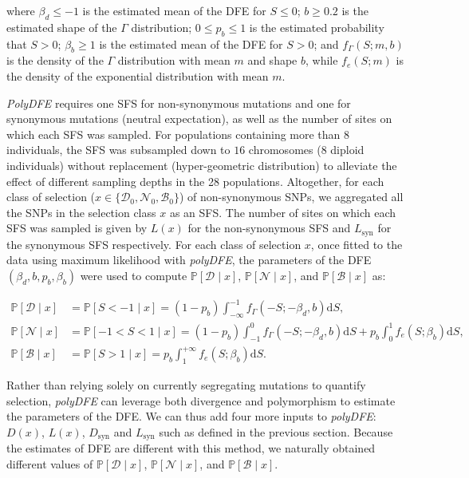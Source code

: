 \documentclass[10pt,letterpaper]{article}
\newcommand{\der}{\text{d}}
\newcommand{\proba}{\mathbb{P}}
\newcommand{\SphyDel}{\mathcal{D}_0}
\newcommand{\SphyNeu}{\mathcal{N}_0}
\newcommand{\SphyBen}{\mathcal{B}_0}
\newcommand{\Sphyclass}{x}
\newcommand{\given}{\mid}
\newcommand{\Spop}{S}
\newcommand{\SpopDel}{\mathcal{D}}
\newcommand{\SpopNeu}{\mathcal{N}}
\newcommand{\SpopBen}{\mathcal{B}}
\newcommand{\AdvMean}{\beta_b}
\newcommand{\DelMean}{\beta_d}
\begin{document}
where $\DelMean \leq -1 $ is the estimated mean of the DFE for $\Spop \leq 0$;
$b \geq 0.2$ is the estimated shape of the $\Gamma$ distribution;
$0 \leq p_b \leq 1$ is the estimated probability that $\Spop > 0$;
$\AdvMean \geq 1$ is the estimated mean of the DFE for $\Spop > 0$;
and $f_{\Gamma}(\Spop; m, b)$ is the density of the $\Gamma$ distribution with mean $m$ and shape $b$, while $f_{e}(\Spop; m)$ is the density of the exponential distribution with mean $m$.

\textit{PolyDFE} requires one SFS for non-synonymous mutations and one for synonymous mutations (neutral expectation), as well as the number of sites on which each SFS was sampled.
For populations containing more than $8$ individuals, the SFS was subsampled down to $16$ chromosomes ($8$ diploid individuals) without replacement (hyper-geometric distribution) to alleviate the effect of different sampling depths in the 28 populations.
Altogether, for each class of selection ($\Sphyclass \in \{\SphyDel, \SphyNeu, \SphyBen \}$) of non-synonymous SNPs, we aggregated all the SNPs in the selection class $\Sphyclass$ as an SFS.
The number of sites on which each SFS was sampled is given by $L(\Sphyclass)$ for the non-synonymous SFS and $L_{\text{syn}}$ for the synonymous SFS respectively.
For each class of selection $\Sphyclass$, once fitted to the data using maximum likelihood with \textit{polyDFE}, the parameters of the DFE $\left( \DelMean , b, p_b, \AdvMean \right)$ were used to compute $\proba [ \SpopDel \given  \Sphyclass] $, $\proba [ \SpopNeu \given \Sphyclass]$, and $\proba [ \SpopBen \given \Sphyclass]$ as:

\begin{align}
\proba [ \SpopDel \given  \Sphyclass] &= \proba [ \Spop < -1 \given \Sphyclass ] = \left( 1 - p_b \right) \int_{-\infty}^{-1} f_{\Gamma}(-\Spop; -\DelMean, b) \der \Spop, \label{eq:polyProbaDel} \\
\proba [ \SpopNeu \given \Sphyclass] &= \proba [ -1 < \Spop < 1 \given \Sphyclass ] = \left( 1 - p_b \right) \int_{-1}^{0} f_{\Gamma}(-\Spop; -\DelMean, b) \der \Spop + p_b \int_{0}^{1} f_{e}(\Spop; \AdvMean) \der \Spop, \\
\proba [ \SpopBen \given \Sphyclass] &= \proba [ \Spop > 1 \given \Sphyclass] = p_b \int_{1}^{+\infty} f_{e}(\Spop; \AdvMean) \der \Spop. \label{eq:polyProbaAdv}
\end{align}

Rather than relying solely on currently segregating mutations to quantify selection, \textit{polyDFE} can leverage both divergence and polymorphism to estimate the parameters of the DFE.
We can thus add four more inputs to \textit{polyDFE}: $D \left( \Sphyclass \right) $, $L \left( \Sphyclass \right)$, $D_{\text{syn}}$ and $L_{\text{syn}}$ such as defined in the previous section.
Because the estimates of DFE are different with this method, we naturally obtained different values of $\proba [ \SpopDel \given  \Sphyclass] $, $\proba [ \SpopNeu \given \Sphyclass]$, and $\proba [ \SpopBen \given \Sphyclass]$.
\end{document}

